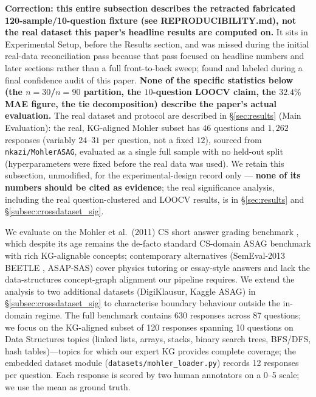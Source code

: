 \documentclass[conference]{IEEEtran}
\begin{document}
\textbf{Correction: this entire subsection describes the retracted
fabricated 120-sample/10-question fixture (see REPRODUCIBILITY.md), not
the real dataset this paper's headline results are computed on.} It sits
in Experimental Setup, before the Results section, and was missed during
the initial real-data reconciliation pass because that pass focused on
headline numbers and later sections rather than a full front-to-back
sweep; found and labeled during a final confidence audit of this paper.
\textbf{None of the specific statistics below (the $n=30$/$n=90$
partition, the $10$-question LOOCV claim, the $32.4\%$ MAE figure, the
tie decomposition) describe the paper's actual evaluation.} The real
dataset and protocol are described in \S\ref{sec:results} (Main
Evaluation): the real, KG-aligned Mohler subset has $46$ questions and
$1{,}262$ responses (variably $24$--$31$ per question, not a fixed $12$),
sourced from \texttt{nkazi/MohlerASAG}, evaluated as a single full sample
with no held-out split (hyperparameters were fixed before the real data
was used). We retain this subsection, unmodified, for the experimental-design
record only --- \textbf{none of its numbers should be cited as
evidence}; the real significance analysis, including the real
question-clustered and LOOCV results, is in
\S\ref{sec:results} and \S\ref{subsec:crossdataset_sig}.

We evaluate on the Mohler et al.\ (2011) CS short answer grading benchmark
\cite{mohler2011}, which despite its age remains the de-facto standard
CS-domain ASAG benchmark with rich KG-alignable concepts; contemporary
alternatives (SemEval-2013 BEETLE \cite{dzikovska2013}, ASAP-SAS) cover
physics tutoring or essay-style answers and lack the data-structures
concept-graph alignment our pipeline requires. We extend the analysis to
two additional datasets (DigiKlausur, Kaggle ASAG) in
\S\ref{subsec:crossdataset_sig} to characterise boundary behaviour
outside the in-domain regime. The full benchmark contains 630 responses across 87 questions;
we focus on the KG-aligned subset of 120 responses spanning 10 questions on
Data Structures topics (linked lists, arrays, stacks, binary search trees, BFS/DFS,
hash tables)---topics for which our expert KG provides complete coverage; the
embedded dataset module (\texttt{datasets/mohler\_loader.py}) records 12
responses per question. Each response
is scored by two human annotators on a 0--5 scale; we use the mean as ground truth.
\end{document}

